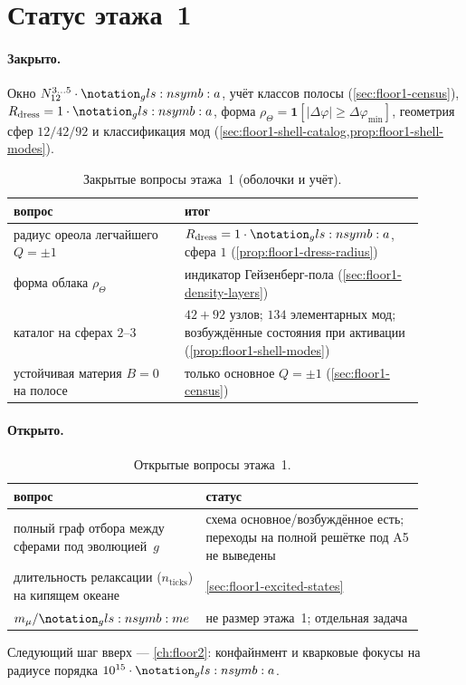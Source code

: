 \section{Статус этажа~1}
\label{sec:floor1-open}

\paragraph{Закрыто.}
Окно $N_{12}^{3\ldots5}\cdot\caStepSpace$, учёт классов полосы (\cref{sec:floor1-census}),
$R_{\mathrm{dress}}=1\cdot\caStepSpace$,
форма $\rho_\Theta=\mathbf{1}[|\Delta\varphi|\ge\Delta\varphi_{\min}]$,
геометрия сфер $12/42/92$ и классификация мод (\cref{sec:floor1-shell-catalog,prop:floor1-shell-modes}).

\begin{table}[htbp]
  \centering
  \caption{Закрытые вопросы этажа~1 (оболочки и учёт).}
  \label{tab:floor1-closed}
  \begin{tabular}{@{}p{0.38\linewidth}p{0.52\linewidth}@{}}
    \toprule
    вопрос & итог \\
    \midrule
    радиус ореола легчайшего $Q=\pm1$ &
    $R_{\mathrm{dress}}=1\cdot\caStepSpace$, сфера $1$ (\cref{prop:floor1-dress-radius}) \\
    форма облака $\rho_\Theta$ &
    индикатор Гейзенберг-пола (\cref{sec:floor1-density-layers}) \\
    каталог на сферах $2$--$3$ &
    $42+92$ узлов; $134$ элементарных мод; возбуждённые состояния при активации (\cref{prop:floor1-shell-modes}) \\
    устойчивая материя $B=0$ на полосе &
    только основное $Q=\pm1$ (\cref{sec:floor1-census}) \\
    \bottomrule
  \end{tabular}
\end{table}

\paragraph{Открыто.}

\begin{table}[htbp]
  \centering
  \caption{Открытые вопросы этажа~1.}
  \label{tab:floor1-open}
  \begin{tabular}{@{}p{0.38\linewidth}p{0.52\linewidth}@{}}
    \toprule
    вопрос & статус \\
    \midrule
    полный граф отбора между сферами под эволюцией~$g$ &
    схема основное/возбуждённое есть; переходы на полной решётке под A5 не выведены \\
    длительность релаксации ($n_{\mathrm{ticks}}$) на кипящем океане &
    \cref{sec:floor1-excited-states} \\
    $m_\mu/\massElectron$ &
    не размер этажа~1; отдельная задача \\
    \bottomrule
  \end{tabular}
\end{table}

Следующий шаг вверх --- \cref{ch:floor2}: конфайнмент и кварковые фокусы
на радиусе порядка $10^{15}\cdot\caStepSpace$.
